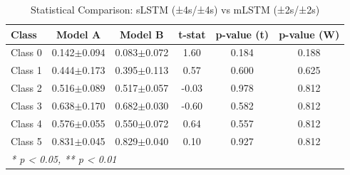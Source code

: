 \begin{table}[htbp]
\centering
\caption{Statistical Comparison: sLSTM (±4s/±4s) vs mLSTM (±2s/±2s)}
\label{tab:comparison_class_slstm_±4s_±4s_vs_mlstm_±2s_±2s}
\begin{tabular}{lccccc}
\toprule
\textbf{Class} & \textbf{Model A} & \textbf{Model B} & \textbf{t-stat} & \textbf{p-value (t)} & \textbf{p-value (W)} \\
\midrule
Class 0 & 0.142$\pm$0.094 & 0.083$\pm$0.072 & 1.60 & 0.184 & 0.188 \\
Class 1 & 0.444$\pm$0.173 & 0.395$\pm$0.113 & 0.57 & 0.600 & 0.625 \\
Class 2 & 0.516$\pm$0.089 & 0.517$\pm$0.057 & -0.03 & 0.978 & 0.812 \\
Class 3 & 0.638$\pm$0.170 & 0.682$\pm$0.030 & -0.60 & 0.582 & 0.812 \\
Class 4 & 0.576$\pm$0.055 & 0.550$\pm$0.072 & 0.64 & 0.557 & 0.812 \\
Class 5 & 0.831$\pm$0.045 & 0.829$\pm$0.040 & 0.10 & 0.927 & 0.812 \\
\bottomrule
\multicolumn{6}{l}{\textit{* p < 0.05, ** p < 0.01}} \\
\end{tabular}
\end{table}